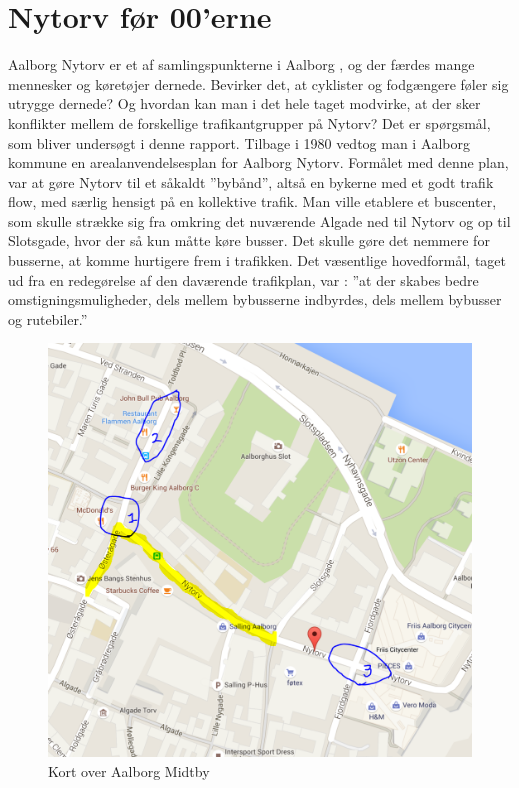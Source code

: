 \section{Nytorv før 00'erne}
\label{sec:nytorv_foer_null}
Aalborg Nytorv er et af samlingspunkterne i Aalborg , og der færdes mange mennesker og køretøjer dernede. Bevirker det, at cyklister og fodgængere føler sig utrygge dernede? Og hvordan kan man i det hele taget modvirke, at der sker konflikter mellem de forskellige trafikantgrupper på Nytorv? Det er spørgsmål, som bliver undersøgt i denne rapport.
Tilbage i 1980 vedtog man i Aalborg kommune en arealanvendelsesplan for Aalborg Nytorv. \autocite{Madsen2010}
Formålet med denne plan, var at gøre Nytorv til et såkaldt ”bybånd”, altså en bykerne med et godt trafik flow, med særlig hensigt på en kollektive trafik. Man ville etablere et buscenter, som skulle strække sig fra omkring det nuværende Algade ned til Nytorv og op til Slotsgade, hvor der så kun måtte køre busser. Det skulle gøre det nemmere for busserne, at komme hurtigere frem i trafikken. Det  væsentlige hovedformål, taget ud fra en redegørelse af den daværende trafikplan, var :
”at der skabes bedre omstigningsmuligheder, dels mellem bybusserne     indbyrdes, dels mellem bybusser og rutebiler.” 
\begin{figure}
\centering
\includegraphics[scale=0.5]{figures/Billederogfigur/opserveringspunkter2.PNG}
\caption{Kort over Aalborg Midtby}
\end{figure}
